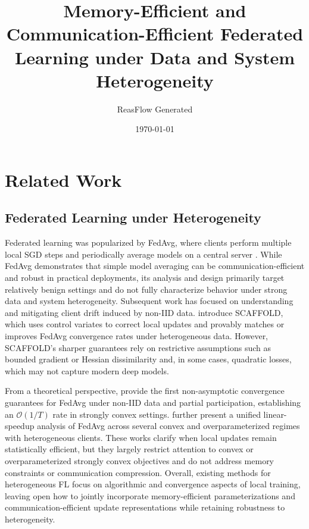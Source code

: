 \documentclass[11pt]{article}
\title{Memory-Efficient and Communication-Efficient Federated Learning under Data and System Heterogeneity}
\author{ReasFlow Generated}
\date{\today}
\begin{document}
\maketitle

\section{Related Work}

\subsection{Federated Learning under Heterogeneity}

Federated learning was popularized by FedAvg, where clients perform multiple local SGD steps and periodically average models on a central server \citep{mcmahan2016communication}. While FedAvg demonstrates that simple model averaging can be communication-efficient and robust in practical deployments, its analysis and design primarily target relatively benign settings and do not fully characterize behavior under strong data and system heterogeneity. Subsequent work has focused on understanding and mitigating client drift induced by non-IID data. \citet{karimireddy2019scaffold} introduce SCAFFOLD, which uses control variates to correct local updates and provably matches or improves FedAvg convergence rates under heterogeneous data. However, SCAFFOLD’s sharper guarantees rely on restrictive assumptions such as bounded gradient or Hessian dissimilarity and, in some cases, quadratic losses, which may not capture modern deep models.

From a theoretical perspective, \citet{li2019convergence} provide the first non-asymptotic convergence guarantees for FedAvg under non-IID data and partial participation, establishing an \(\mathcal{O}(1/T)\) rate in strongly convex settings. \citet{qu2023unified} further present a unified linear-speedup analysis of FedAvg across several convex and overparameterized regimes with heterogeneous clients. These works clarify when local updates remain statistically efficient, but they largely restrict attention to convex or overparameterized strongly convex objectives and do not address memory constraints or communication compression. Overall, existing methods for heterogeneous FL focus on algorithmic and convergence aspects of local training, leaving open how to jointly incorporate memory-efficient parameterizations and communication-efficient update representations while retaining robustness to heterogeneity.
\end{document}
